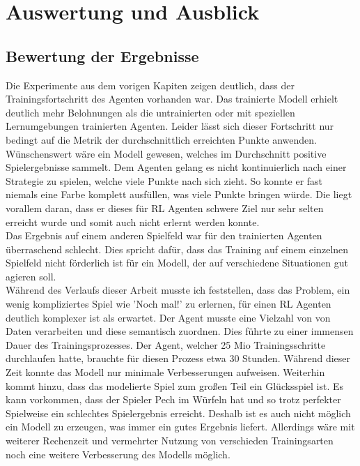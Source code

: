 

\clearpage
\chapter{Auswertung und Ausblick}

\section{Bewertung der Ergebnisse}

Die Experimente aus dem vorigen Kapiten zeigen deutlich, dass der Trainingsfortschritt des Agenten vorhanden war.
Das trainierte Modell erhielt deutlich mehr Belohnungen als die untrainierten oder mit speziellen Lernumgebungen trainierten Agenten. Leider lässt sich dieser Fortschritt nur bedingt auf die Metrik der durchschnittlich erreichten Punkte anwenden. Wünschenswert wäre ein Modell gewesen, welches im Durchschnitt positive Spielergebnisse sammelt. Dem Agenten gelang es nicht kontinuierlich nach einer Strategie zu spielen, welche viele Punkte nach sich zieht. So konnte er fast niemals eine Farbe komplett ausfüllen, was viele Punkte bringen würde. Die liegt vorallem daran, dass er dieses für RL Agenten schwere Ziel nur sehr selten erreicht wurde und somit auch nicht erlernt werden konnte.\\ Das Ergebnis auf einem anderen Spielfeld war für den trainierten Agenten überraschend schlecht. Dies spricht dafür, dass das Training auf einem einzelnen Spielfeld nicht förderlich ist für ein Modell, der auf verschiedene Situationen gut agieren soll. \\ Während des Verlaufs dieser Arbeit musste ich feststellen, dass das Problem, ein wenig kompliziertes Spiel wie  'Noch mal!' zu erlernen, für einen RL Agenten deutlich komplexer ist als erwartet. Der Agent musste eine Vielzahl von von Daten verarbeiten und diese semantisch zuordnen. Dies führte zu einer immensen Dauer des Trainingsprozesses. Der Agent, welcher 25 Mio Trainingsschritte durchlaufen hatte, brauchte für diesen Prozess etwa 30 Stunden. Während dieser Zeit konnte das Modell nur minimale Verbesserungen aufweisen. Weiterhin kommt hinzu, dass das modelierte Spiel zum großen Teil ein Glücksspiel ist. Es kann vorkommen, dass der Spieler Pech im Würfeln hat und so trotz perfekter Spielweise ein schlechtes Spielergebnis erreicht. Deshalb ist es auch nicht möglich ein Modell zu erzeugen, was immer ein gutes Ergebnis liefert. Allerdings wäre mit weiterer Rechenzeit und vermehrter Nutzung von verschieden Trainingsarten noch eine weitere Verbesserung des Modells möglich.

